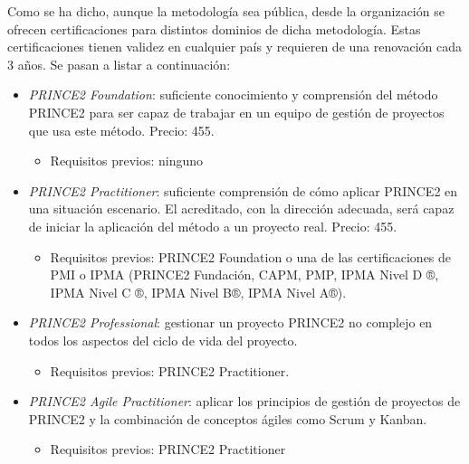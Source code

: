 Como se ha dicho, aunque la metodología sea pública, desde la organización se ofrecen certificaciones para distintos dominios de dicha metodología. Estas certificaciones tienen validez en cualquier país y requieren de una renovación cada 3 años. Se pasan a listar a continuación:
\begin{itemize}
	\item \emph{PRINCE2 Foundation}: suficiente conocimiento y comprensión del método PRINCE2 para ser capaz de trabajar en un equipo de gestión de proyectos que usa este método. Precio: 455\geneuronarrow.
	\begin{itemize}
		\item Requisitos previos: ninguno
	\end{itemize}
	\item \emph{PRINCE2 Practitioner}: suficiente comprensión de cómo aplicar PRINCE2 en una situación escenario. El acreditado, con la dirección adecuada, será capaz de iniciar la aplicación del método a un proyecto real. Precio: 455\geneuronarrow.
	\begin{itemize}
		\item Requisitos previos: PRINCE2 Foundation o una de las certificaciones de PMI o IPMA (PRINCE2 Fundación, CAPM, PMP, IPMA Nivel D ®, IPMA Nivel C ®, IPMA Nivel B®, IPMA Nivel A®).
	\end{itemize}
	\item \emph{PRINCE2 Professional}: gestionar un proyecto PRINCE2 no complejo en todos los aspectos del ciclo de vida del proyecto.
	\begin{itemize}
		\item Requisitos previos: PRINCE2 Practitioner.
	\end{itemize}
	\item \emph{PRINCE2 Agile Practitioner}: aplicar los principios de gestión de proyectos de PRINCE2 y la combinación de conceptos ágiles como Scrum y Kanban.
	\begin{itemize}
		\item Requisitos previos: PRINCE2 Practitioner
	\end{itemize}
\end{itemize}
